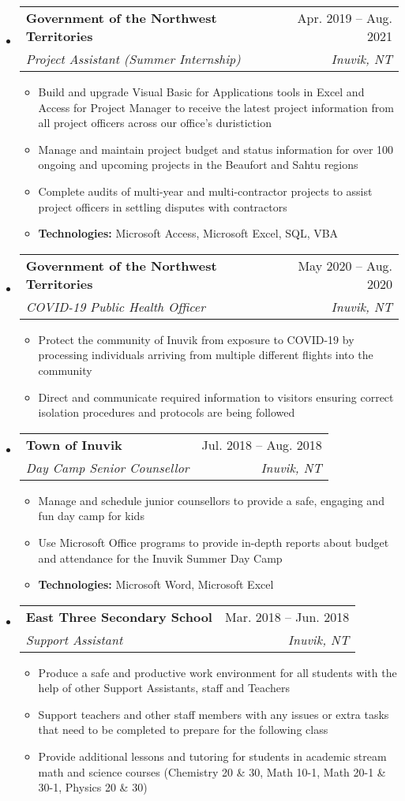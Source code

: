 \documentclass[letterpaper,12pt]{article}[leftmargin=*]
\makeatletter
\def \entryspacing {-0pt}
\newcommand{\resumeEntryStart}{\begin{itemize}[leftmargin=2.5mm]}
\newcommand{\resumeEntryEnd}{\end{itemize}\vspace{\entryspacing}}
\newcommand{\resumeItemListStart}{\begin{itemize}[leftmargin=4.5mm]}
\newcommand{\resumeItemListEnd}{\end{itemize}}
\newcommand{\resumeItem}[1]{
  \item\small{
    {#1 \vspace{-2pt}}
  }
}
\newcommand{\resumeEntryTSDL}[4]{
  \vspace{-1pt}\item[]
    \begin{tabularx}{0.97\textwidth}{X@{\hspace{60pt}}r}
      \textbf{\color{primary}#1} & {\firabook\color{accent}\small#2} \\
      \textit{\color{accent}\small#3} & \textit{\color{accent}\small#4} \\
    \end{tabularx}\vspace{-6pt}
}
\makeatother
\begin{document}
  \resumeEntryStart
    \resumeEntryTSDL
      {Government of the Northwest Territories}{Apr. 2019 -- Aug. 2021}
      {Project Assistant (Summer Internship)}{Inuvik, NT}
    \resumeItemListStart
      \resumeItem {Build and upgrade Visual Basic for Applications tools in Excel and Access for Project Manager to receive the latest
      project information from all project officers across our office's duristiction}
      \resumeItem {Manage and maintain project budget and status information for over 100 ongoing and upcoming projects in the Beaufort 
      and Sahtu regions}
      \resumeItem {Complete audits of multi-year and multi-contractor projects to assist project officers in settling disputes with contractors}
      \resumeItem{\textbf{Technologies:} Microsoft Access, Microsoft Excel, SQL, VBA}
    \resumeItemListEnd
  \resumeEntryEnd

  \resumeEntryStart
  \resumeEntryTSDL
    {Government of the Northwest Territories}{May 2020 -- Aug. 2020}
    {COVID-19 Public Health Officer}{Inuvik, NT}
  \resumeItemListStart
    \resumeItem {Protect the community of Inuvik from exposure to COVID-19 by processing individuals arriving from multiple different
    flights into the community}
    \resumeItem {Direct and communicate required information to visitors ensuring correct isolation procedures and protocols are 
    being followed}
  \resumeItemListEnd
\resumeEntryEnd

\resumeEntryStart
\resumeEntryTSDL
  {Town of Inuvik}{Jul. 2018 -- Aug. 2018}
  {Day Camp Senior Counsellor}{Inuvik, NT}
\resumeItemListStart
  \resumeItem {Manage and schedule junior counsellors to provide a safe, engaging and fun day camp for kids}
  \resumeItem {Use Microsoft Office programs to provide in-depth reports about budget and attendance for the Inuvik Summer Day Camp}
  \resumeItem {\textbf{Technologies:} Microsoft Word, Microsoft Excel}
\resumeItemListEnd
\resumeEntryEnd

\resumeEntryStart
\resumeEntryTSDL
  {East Three Secondary School}{Mar. 2018 -- Jun. 2018}
  {Support Assistant}{Inuvik, NT}
\resumeItemListStart
  \resumeItem {Produce a safe and productive work environment for all students with the help of other Support Assistants, staff and Teachers}
  \resumeItem {Support teachers and other staff members with any issues or extra tasks that need to be completed to prepare for the
  following class}
  \resumeItem {Provide additional lessons and tutoring for students in academic stream math and science courses (Chemistry 20 \& 30, Math 10-1, Math 20-1 \& 30-1, Physics 20 \& 30)}
\resumeItemListEnd
\resumeEntryEnd
\end{document}
